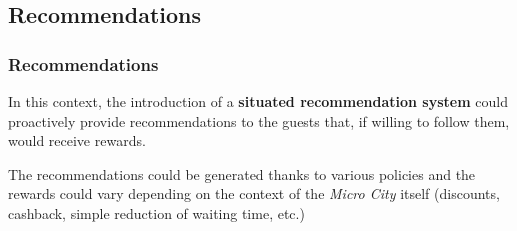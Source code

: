 \subsection{Recommendations}\label{subsec:recommendations}
\begin{frame}
    \frametitle{Recommendations}
    In this context, the introduction of a \textbf{situated recommendation system} could proactively provide recommendations to the guests that, if willing to follow them, would receive rewards.

    \bigskip

    The recommendations could be generated thanks to various policies and the rewards could vary depending on the context of the \textit{Micro City} itself (discounts, cashback, simple reduction of waiting time, etc.)
\end{frame}

